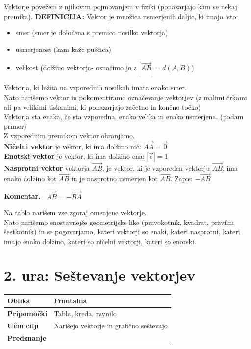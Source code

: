 \documentclass[a4paper,11pt]{article}
\newenvironment{komentar}{%
  \par\medskip\noindent\textbf{Komentar.}\itshape\ }{\par\medskip}
\begin{document}
Vektorje povežem z njihovim pojmovanjem v fiziki (ponazarjajo kam se nekaj premika).
\textbf{DEFINICIJA:} Vektor je množica usmerjenih daljic, ki imajo isto:
\begin{itemize}
    \item smer (smer je določena s premico nosilko vektorja)
    \item usmerjenost (kam kaže puščica)
    \item velikost (dolžino vektorja- označimo jo z $|\vec{AB}|=d(A,B)$)
\end{itemize}
Vektorja, ki ležita na vzporednih nosilkah imata enako smer. \\
Nato narišemo vektor in pokomentiramo označevanje vektorjev (z malimi črkami ali pa velikimi tiskanimi, ki ponazarjajo začetno in končno točko)\\
Vektorja sta enaka, če sta vzporedna, enako velika in enako usmerjena. (podam primer)\\
Z vzporednim premikom vektor ohranjamo.\\
\textbf{Ničelni vektor} je vektor, ki ima dolžino nič: $\vec{AA}=\vec{0}$\\
\textbf{Enotski vektor} je vektor, ki ima dolžino ena: $|\vec{e}|=1$\\
\textbf{Nasprotni vektor} vektorja $\vec{AB}$, je vektor, ki je vzporeden vektorju $\vec{AB}$, ima enako dolžino kot $\vec{AB}$ in je nasprotno usmerjen kot $\vec{AB}$. Zapis: $-\vec{AB}$
\begin{komentar}
    $\vec{AB}=-\vec{BA}$
\end{komentar}
Na tablo narišem vse zgoraj omenjene vektorje.\\
Nato narišemo enostavnejše geometrijske like (pravokotnik, kvadrat, pravilni šestkotnik) in se pogovarjamo, kateri vektorji so enaki, kateri nasprotni, kateri imajo enako dolžino, kateri so ničelni vektorji, kateri so enotski.\\


\newpage \section{2. ura: Seštevanje vektorjev}
\begin{tabularx}{\textwidth}{|>{\bfseries\RaggedRight}p{2.7cm}|X|}
\hline
Oblika & Frontalna \\ \hline
Pripomočki & Tabla, kreda, ravnilo \\ \hline
Učni cilji & Narišejo vektorje in grafično seštevajo  \\ \hline
Predznanje &  \\ \hline

\end{tabularx}
\\
\end{document}
